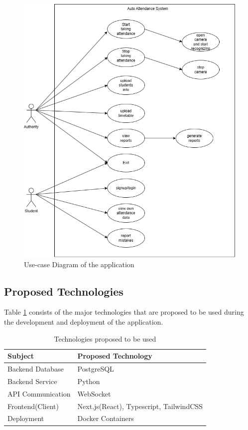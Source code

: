 \begin{figure}[H]
    \includegraphics[width=\linewidth]{figures/use-case.png}
    \centering
    \caption{Use-case Diagram of the application}
    \label{fig:usecase}
\end{figure}

\subsection{Proposed Technologies}
Table \ref{table:tech} consists of the major technologies that are proposed to be used during the development and deployment of the application.

\renewcommand{\arraystretch}{1.5}
\begin{table}[H]
\centering
    \begin{tabular}{|l|l|}
        \hline
        \textbf{Subject}    & \textbf{Proposed Technology} \\ \hline
        Backend Database            & PostgreSQL           \\ \hline
        Backend Service    & Python        \\ \hline
        API Communication & WebSocket \\ \hline
        Frontend(Client)  & Next.js(React), Typescript, TailwindCSS              \\ \hline
        Deployment  & Docker Containers              \\ \hline
    \end{tabular}
    \caption{Technologies proposed to be used}
    \label{table:tech}
\end{table}

